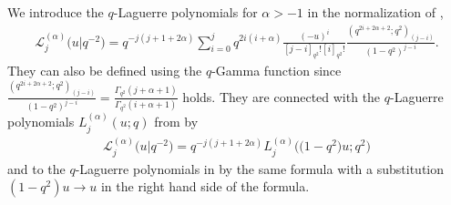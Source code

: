 \documentclass[11pt]{article}
\newcommand{\cL}{\mathcal{L}}
\numberwithin{equation}{section}
\begin{document}
We introduce the $q$-Laguerre polynomials for $\alpha>-1$ in the normalization of \cite[p.~24]{MR2595267},
\begin{gather}
\label{qLaginv}
\cL^{(\alpha)}_j\big(u|q^{-2}\big) = q^{-j(j+1+2\alpha)}\sum_{i=0}^jq^{2i(i+\alpha)}\frac{(-u)^i}{[j-i]_{q^2}![i]_{q^2}!}\frac{(q^{2i+2\alpha+2};q^2)_{(j-i)}}{(1-q^2)^{j-i}}.
\end{gather}
They can also be def\/ined using the $q$-Gamma function since $\frac{(q^{2i+2\alpha+2};q^2)_{(j-i)}}{(1-q^2)^{j-i}}=\frac{\Gamma_{q^2}(j+\alpha+1)}{\Gamma_{q^2}(i+\alpha+1)}$ holds. They are connected with the $q$-Laguerre polynomials $L_j^{(\alpha)}(u;q)$ from \cite[Section~3.21]{Koekoek}  by
\begin{gather*}
\cL_j^{(\alpha)}\big(u|q^{-2}\big) = q^{-j(j+1+2\alpha)}L_j^{(\alpha)}\big(\big(1-q^2\big)u;q^2\big)
\end{gather*}
and to the $q$-Laguerre polynomials in \cite{MR0618759} by the same formula with a substitution  $(1-q^2)u\to u$ in the right hand side of the formula.
\end{document}
